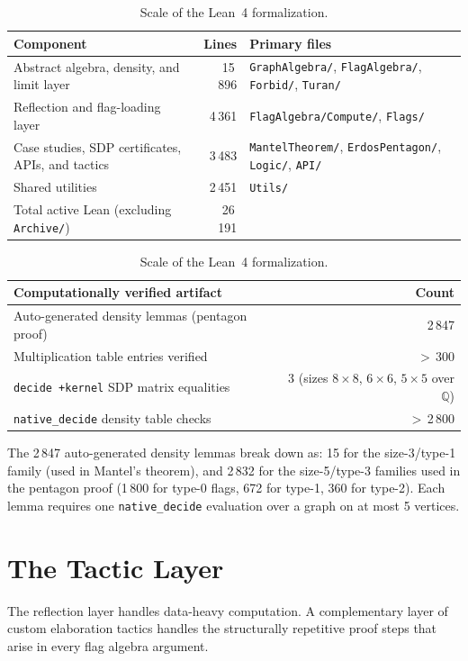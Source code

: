 \documentclass{article}
\newcommand{\lean}[1]{\texttt{#1}}
\begin{document}
\begin{table}
  \small
  \caption{Scale of the Lean~4 formalization.}
  \label{tab:metrics}
  \begin{tabular}{lrl}
    \toprule
    Component & Lines & Primary files \\
    \midrule
    Abstract algebra, density, and limit layer & 15\,896 &
      \lean{GraphAlgebra/}, \lean{FlagAlgebra/}, \lean{Forbid/}, \lean{Turan/} \\
    Reflection and flag-loading layer & 4\,361 &
      \lean{FlagAlgebra/Compute/}, \lean{Flags/} \\
    Case studies, SDP certificates, APIs, and tactics & 3\,483 &
      \lean{MantelTheorem/}, \lean{ErdosPentagon/}, \lean{Logic/}, \lean{API/} \\
    Shared utilities & 2\,451 &
      \lean{Utils/} \\
    \midrule
    Total active Lean (excluding \lean{Archive/}) & 26\,191 & \\
    \bottomrule
  \end{tabular}

  \medskip
  \begin{tabular}{lr}
    \toprule
    Computationally verified artifact & Count \\
    \midrule
    Auto-generated density lemmas (pentagon proof) & 2\,847 \\
    Multiplication table entries verified & $>$\,300 \\
    \lean{decide~+kernel} SDP matrix equalities & 3 (sizes $8{\times}8$, $6{\times}6$, $5{\times}5$ over $\mathbb{Q}$) \\
    \lean{native\_decide} density table checks & $>$\,2\,800 \\
    \bottomrule
  \end{tabular}
\end{table}

The 2\,847 auto-generated density lemmas break down as: 15 for the
size-3/type-1 family (used in Mantel's theorem), and 2\,832 for the
size-5/type-3 families used in the pentagon proof (1\,800 for type-0 flags,
672 for type-1, 360 for type-2).  Each lemma requires one \lean{native\_decide}
evaluation over a graph on at most 5 vertices.


\section{The Tactic Layer}
\label{sec:tactics}

The reflection layer handles data-heavy computation.  A complementary layer of
custom elaboration tactics handles the structurally repetitive proof steps that
arise in every flag algebra argument.
\end{document}
